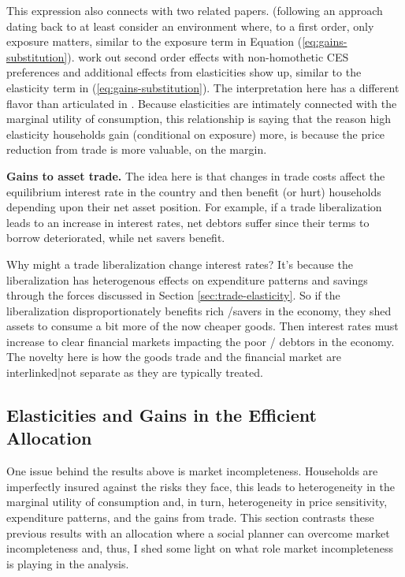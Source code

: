 \documentclass[12pt,pdftex]{article}
\begin{document}
\begin{onehalfspacing}
This expression also connects with two related papers. \citet{borusyak2021distributional} (following an approach dating back to at least \citet{} consider an environment where, to a first order, only exposure matters, similar to the exposure term in Equation (\ref{eq:gains-substitution}). \citet{auer2022unequal} work out second order effects with non-homothetic CES preferences and additional effects from elasticities show up, similar to the elasticity term in (\ref{eq:gains-substitution}). The interpretation here has a different flavor than articulated in \citet{auer2022unequal}. Because elasticities are intimately connected with the marginal utility of consumption, this relationship is saying that the reason high elasticity households gain (conditional on exposure) more, is because the price reduction from trade is more valuable, on the margin.

\textbf{Gains to asset trade.} The idea here is that changes in trade costs affect the equilibrium interest rate in the country and then benefit (or hurt) households depending upon their net asset position. For example, if a trade liberalization leads to an increase in interest rates, net debtors suffer since their terms to borrow deteriorated, while net savers benefit.

Why might a trade liberalization change interest rates? It's because the liberalization has heterogenous effects on expenditure patterns and savings through the forces discussed in Section \ref{sec:trade-elasticity}. So if the liberalization disproportionately benefits rich /savers in the economy, they shed assets to consume a bit more of the now cheaper goods. Then interest rates must increase to clear financial markets impacting the poor / debtors in the economy. The novelty here is how the goods trade and the financial market are interlinked|not separate as they are typically treated.

\subsection{Elasticities and Gains in the Efficient Allocation}\label{sec:log-preferences}

One issue behind the results above is market incompleteness. Households are imperfectly insured against the risks they face, this leads to heterogeneity in the marginal utility of consumption and, in turn, heterogeneity in price sensitivity, expenditure patterns, and the gains from trade. This section contrasts these previous results with an allocation where a social planner can overcome market incompleteness and, thus, I shed some light on what role market incompleteness is playing in the analysis.


\end{onehalfspacing}
\end{document}
